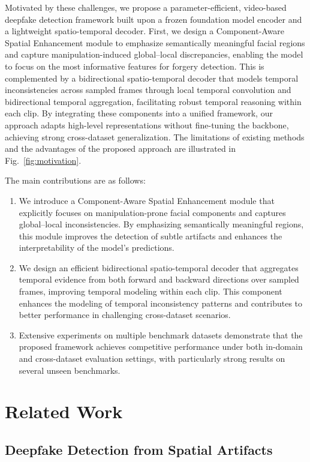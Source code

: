 \documentclass[runningheads]{llncs}
\begin{document}
Motivated by these challenges, we propose a parameter-efficient, video-based deepfake detection framework built upon a frozen foundation model encoder and a lightweight spatio-temporal decoder. First, we design a Component-Aware Spatial Enhancement module to emphasize semantically meaningful facial regions and capture manipulation-induced global--local discrepancies, enabling the model to focus on the most informative features for forgery detection. This is complemented by a bidirectional spatio-temporal decoder that models temporal inconsistencies across sampled frames through local temporal convolution and bidirectional temporal aggregation, facilitating robust temporal reasoning within each clip. By integrating these components into a unified framework, our approach adapts high-level representations without fine-tuning the backbone, achieving strong cross-dataset generalization. The limitations of existing methods and the advantages of the proposed approach are illustrated in Fig.~\ref{fig:motivation}.

The main contributions are as follows:
\begin{enumerate}[
  label=(\arabic*),
]
  \item We introduce a Component-Aware Spatial Enhancement module that explicitly focuses on manipulation-prone facial components and captures global--local inconsistencies. By emphasizing semantically meaningful regions, this module improves the detection of subtle artifacts and enhances the interpretability of the model’s predictions.
  \item We design an efficient bidirectional spatio-temporal decoder that aggregates temporal evidence from both forward and backward directions over sampled frames, improving temporal modeling within each clip. This component enhances the modeling of temporal inconsistency patterns and contributes to better performance in challenging cross-dataset scenarios.
  \item Extensive experiments on multiple benchmark datasets demonstrate that the proposed framework achieves competitive performance under both in-domain and cross-dataset evaluation settings, with particularly strong results on several unseen benchmarks.
\end{enumerate}

\section{Related Work}
\label{sec:related}
\subsection{Deepfake Detection from Spatial Artifacts}
\end{document}
